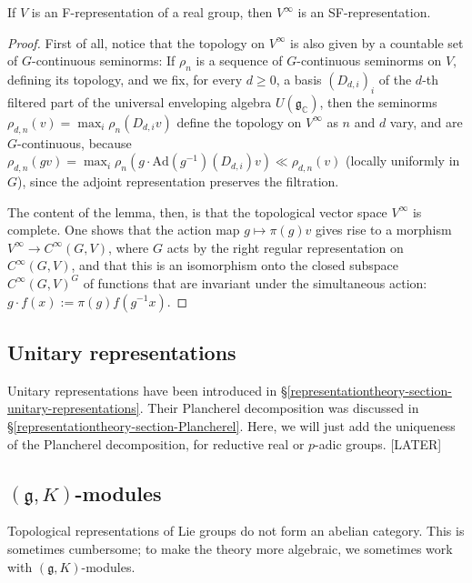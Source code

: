 \begin{lemma}
 \label{lemma-smooth-vectors-Frepresentation}
If $V$ is an F-representation of a real group, then $V^\infty$ is an SF-representation.
\end{lemma}

\begin{proof}
First of all, notice that the topology on $V^\infty$ is also given by a countable set of $G$-continuous seminorms: If $\rho_n$ is a sequence of $G$-continuous seminorms on $V$, defining its topology, and we fix, for every $d\ge 0$, a basis $(D_{d,i})_i$ of the $d$-th filtered part of the universal enveloping algebra $U(\mathfrak g_{\mathbb C})$, then the seminorms $\rho_{d,n}(v) = \max_i \rho_n (D_{d,i}v)$ define the topology on $V^\infty$ as $n$ and $d$ vary, and are $G$-continuous, because $\rho_{d,n}(gv) = \max_i \rho_n (g \cdot \text{Ad}(g^{-1})(D_{d,i}) v) \ll \rho_{d,n}(v)$ (locally uniformly in $G$), since the adjoint representation preserves the filtration. 


The content of the lemma, then, is that the topological vector space $V^\infty$ is complete. One shows that the action map $g\mapsto \pi(g) v$ gives rise to a morphism $V^\infty \to C^\infty(G, V)$, where $G$ acts by the right regular representation on $C^\infty(G, V)$, and that this is an isomorphism onto the closed subspace $C^\infty(G, V)^G$ of functions that are invariant under the simultaneous action: $g\cdot f (x) := \pi(g) f(g^{-1} x)$. 
\end{proof}

\subsection{Unitary representations}
\label{subsection-unitary-representations}

Unitary representations have been introduced in \S \ref{representationtheory-section-unitary-representations}. Their Plancherel decomposition was discussed in \S \ref{representationtheory-section-Plancherel}. Here, we will just add the uniqueness of the Plancherel decomposition, for reductive real or $p$-adic groups. [LATER]


\subsection{$(\mathfrak g, K)$-modules}
\label{subsection-gK-modules}

Topological representations of Lie groups do not form an abelian category. This is sometimes cumbersome; to make the theory more algebraic, we sometimes work with $(\mathfrak g,K)$-modules. 

